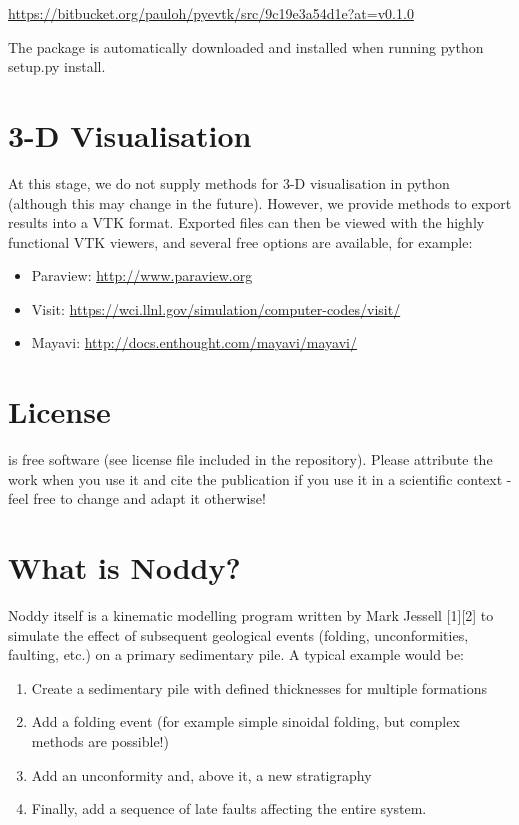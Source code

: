\documentclass[a4paper,10pt,english]{sphinxmanual}
\begin{document}
\href{https://bitbucket.org/pauloh/pyevtk/src/9c19e3a54d1e?at=v0.1.0}{https://bitbucket.org/pauloh/pyevtk/src/9c19e3a54d1e?at=v0.1.0}

The package is automatically downloaded and installed when running
python setup.py install.


\section{3-D Visualisation}
\label{readme:d-visualisation}
At this stage, we do not supply methods for 3-D visualisation in python
(although this may change in the future). However, we provide methods to
export results into a VTK format. Exported files can then be viewed with
the highly functional VTK viewers, and several free options are
available, for example:
\begin{itemize}
\item {} 
Paraview: \href{http://www.paraview.org}{http://www.paraview.org}

\item {} 
Visit: \href{https://wci.llnl.gov/simulation/computer-codes/visit/}{https://wci.llnl.gov/simulation/computer-codes/visit/}

\item {} 
Mayavi: \href{http://docs.enthought.com/mayavi/mayavi/}{http://docs.enthought.com/mayavi/mayavi/}

\end{itemize}


\section{License}
\label{readme:license}
 is free software (see license file included in the repository). Please attribute the work when you use it and cite the publication if you use it in a scientific context - feel free to change and adapt it otherwise!


\section{What is Noddy?}
\label{readme:what-is-noddy}
Noddy itself is a kinematic modelling program written by Mark Jessell
{[}1{]}{[}2{]} to simulate the effect of subsequent geological events (folding,
unconformities, faulting, etc.) on a primary sedimentary pile. A typical
example would be:
\begin{enumerate}
\item {} 
Create a sedimentary pile with defined thicknesses for multiple
formations

\item {} 
Add a folding event (for example simple sinoidal folding, but complex
methods are possible!)

\item {} 
Add an unconformity and, above it, a new stratigraphy

\item {} 
Finally, add a sequence of late faults affecting the entire system.

\end{enumerate}
\end{document}
